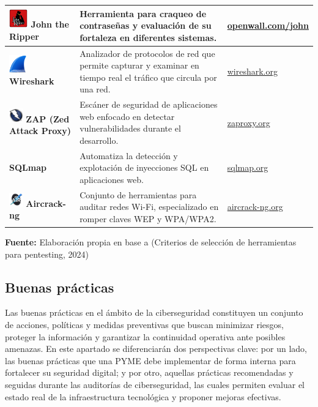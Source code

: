 \documentclass[a4paper, 10pt]{article}
\begin{document}
\begin{table}[H]
\begin{tabular}{|m{5cm}|m{8cm}|m{3.5cm}|}
        \includegraphics[width=0.8cm]{images/john.png} \textbf{John the Ripper} & Herramienta para craqueo de contraseñas y evaluación de su fortaleza en diferentes sistemas. & \href{https://www.openwall.com/john}{openwall.com/john} \\
        \hline
        \includegraphics[width=0.75cm]{images/wireshark.png} \textbf{Wireshark} & Analizador de protocolos de red que permite capturar y examinar en tiempo real el tráfico que circula por una red. & \href{https://www.wireshark.org}{wireshark.org} \\
        \hline
        \includegraphics[width=0.6cm]{images/zap.jpeg} \textbf{ZAP (Zed Attack Proxy)} & Escáner de seguridad de aplicaciones web enfocado en detectar vulnerabilidades durante el desarrollo. & \href{https://www.zaproxy.org}{zaproxy.org} \\
        \hline
        \textbf{SQLmap} & Automatiza la detección y explotación de inyecciones SQL en aplicaciones web. & \href{https://sqlmap.org}{sqlmap.org} \\
        \hline
        \includegraphics[width=0.6cm]{images/aircrack.jpeg} \textbf{Aircrack-ng} & Conjunto de herramientas para auditar redes Wi-Fi, especializado en romper claves WEP y WPA/WPA2. & \href{https://www.aircrack-ng.org}{aircrack-ng.org} \\
        \hline
        \end{tabular}
    \begin{flushleft}\centering
        \footnotesize \textbf{Fuente:} Elaboración propia en base a (Criterios de selección de herramientas para pentesting, 2024)
    \end{flushleft}
    \end{table}


    
   
    
    
    \subsection{Buenas prácticas}
    Las buenas prácticas en el ámbito de la ciberseguridad constituyen un conjunto de acciones, políticas y medidas preventivas que buscan minimizar riesgos, proteger la información y garantizar la continuidad operativa ante posibles amenazas. En este apartado se diferenciarán dos perspectivas clave: por un lado, las buenas prácticas que una PYME debe implementar de forma interna para fortalecer su seguridad digital; y por otro, aquellas prácticas recomendadas y seguidas durante las auditorías de ciberseguridad, las cuales permiten evaluar el estado real de la infraestructura tecnológica y proponer mejoras efectivas.
\end{document}
